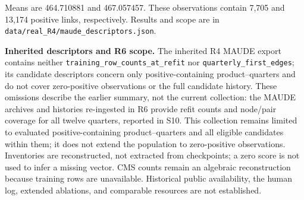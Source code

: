 \documentclass[10pt,a4paper]{article}
\newcommand{\src}[1]{{\small\nolinkurl{#1}}}
\begin{document}
Means are 464.710881 and 467.057457. These observations contain 7,705 and 13,174 positive links, respectively. Results and scope are in \src{data/real_R4/maude_descriptors.json}.

\textbf{Inherited descriptors and R6 scope.} The inherited R4 MAUDE export contains neither \src{training_row_counts_at_refit} nor \src{quarterly_first_edges}; its candidate descriptors concern only positive-containing product--quarters and do not cover zero-positive observations or the full candidate history. These omissions describe the earlier summary, not the current collection: the MAUDE archives and histories re-ingested in R6 provide refit counts and node/pair coverage for all twelve quarters, reported in S10. This collection remains limited to evaluated positive-containing product--quarters and all eligible candidates within them; it does not extend the population to zero-positive observations. Inventories are reconstructed, not extracted from checkpoints; a zero score is not used to infer a missing vector. CMS counts remain an algebraic reconstruction because training rows are unavailable. Historical public availability, the human log, extended ablations, and comparable resources are not established.
\end{document}
